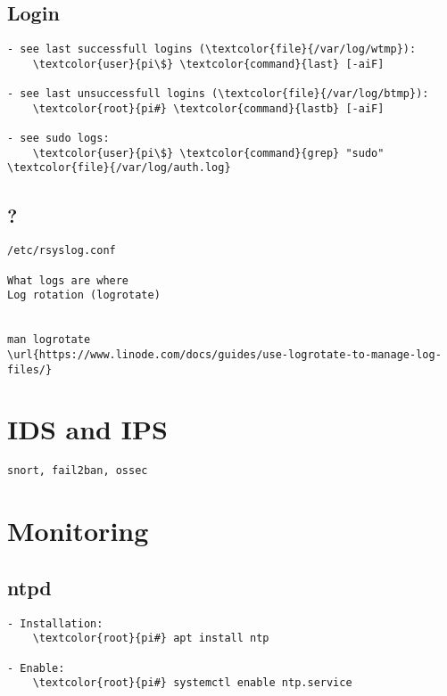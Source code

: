 \documentclass[10pt, a4paper, onecolumn, openany]{book} %
\begin{document}
\subsection{Login}
\begin{Verbatim}[commandchars=\\\{\}]
- see last successfull logins (\textcolor{file}{/var/log/wtmp}):
    \textcolor{user}{pi\$} \textcolor{command}{last} [-aiF]

- see last unsuccessfull logins (\textcolor{file}{/var/log/btmp}):
    \textcolor{root}{pi#} \textcolor{command}{lastb} [-aiF]
    
- see sudo logs:
    \textcolor{user}{pi\$} \textcolor{command}{grep} "sudo" \textcolor{file}{/var/log/auth.log}
\end{Verbatim}

\subsection{?}
\begin{Verbatim}[commandchars=\\\{\}]
/etc/rsyslog.conf
    
What logs are where
Log rotation (logrotate)


man logrotate
\url{https://www.linode.com/docs/guides/use-logrotate-to-manage-log-files/}
\end{Verbatim}

\section{IDS and IPS}
\begin{Verbatim}[commandchars=\\\{\}]
snort, fail2ban, ossec
\end{Verbatim}

\section{Monitoring}
\subsection{ntpd}
\begin{Verbatim}[commandchars=\\\{\}]
- Installation:
    \textcolor{root}{pi#} apt install ntp

- Enable:
    \textcolor{root}{pi#} systemctl enable ntp.service
\end{Verbatim}
\end{document}
